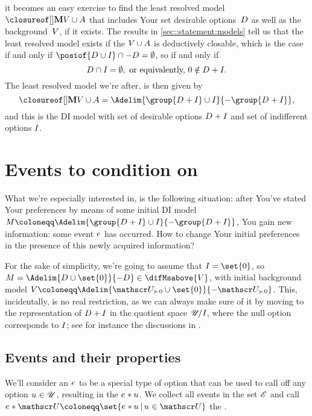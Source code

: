 \documentclass[preprint]{isipta2025}
\begin{document}
it becomes an easy exercise to find the least resolved model~\(\Mclsof{\bgM\cup\A}\) that includes Your set desirable options~\(D_{}\) as well as the background~\(V\), if it exists.
The results in \cref{sec::statement:models} tell us that the least resolved model exists if the \(V\cup A\) is deductively closable, which is the case if and only if \(\posiof{\desirset\cup\indifset}\cap-\desirset=\emptyset\), so if and only if
\begin{equation}\label{eq:D:compatibility}
D_{}\cap I_{}=\emptyset,
\text{ or equivalently, }
0\notin D_{}+I_{}.
\end{equation}
The least resolved model we're after, is then given by
\begin{equation}\label{eq:least:resolved:model}
\Mclsof{\bgM\cup\A}
=\Adelim{\group{\desirset+\indifset}\cup\indifset}{-\group{\desirset+\indifset}},
\end{equation}
and this is the DI model with set of desirable options \(D_{}+I_{}\) and set of indifferent options \(I_{}\).

\section{Events to condition on}\label{sec::events}
What we're especially interested in, is the following situation: after You've stated Your preferences by means of some initial DI model \(\M\coloneqq\Adelim{\group{\desirset+\indifset}\cup\indifset}{-\group{\desirset+\indifset}}\), You gain new information: some event \(e_{}\) has occurred.
How to change Your initial preferences in the presence of this newly acquired information?

For the sake of simplicity, we're going to assume that \(\indifset=\set{0}\), so \(\M=\Adelim{\desirset\cup\set{0}}{-\desirset}\in\difMsabove{\bgM}\), with initial background model \(\bgM\coloneqq\Adelim{\posopts\cup\set{0}}{-\posopts}\).
This, incidentally, is no real restriction, as we can always make sure of it by moving to the representation of \(D_{}+I_{}\) in the quotient space \({\mathscr{U}}\!/{I_{}}\), where the null option corresponds to \(I_{}\); see for instance the discussions in \cite{decooman2015:coherent:predictive:inference,debock2016:partial:exchangeability}.

\subsection{Events and their properties}
We'll consider an  \(e_{}\) to be a special type of option that can be used to call off any option \(u_{}\in\mathscr{U}\), resulting in the  \(e_{}\ast u_{}\).
We collect all events in the set \(\mathscr{E}\) and call \( \calledoff{\opts}\coloneqq\set{\calledoff{\opt}\given\opt\in\opts}\) the .
\end{document}
